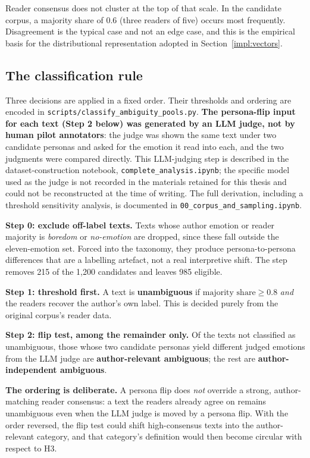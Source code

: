 Reader consensus does not cluster at the top of that scale. In the candidate corpus, a majority
share of $0.6$ (three readers of five) occurs most frequently. Disagreement is the typical case
and not an edge case, and this is the empirical basis for the distributional representation
adopted in Section~\ref{impl:vectors}.

\subsection{The classification rule}
\label{meth:rule}

\noindent
Three decisions are applied in a fixed order. Their thresholds and ordering are encoded in
\texttt{scripts/classify\_ambiguity\_pools.py}. \textbf{The persona-flip input for each text (Step
2 below) was generated by an LLM judge, not by human pilot annotators}: the judge was shown the
same text under two candidate personas and asked for the emotion it read into each, and the two
judgments were compared directly. This LLM-judging step is described in the dataset-construction
notebook, \texttt{complete\_analysis.ipynb}; the specific model used as the judge is not recorded
in the materials retained for this thesis and could not be reconstructed at the time of writing.
The full derivation, including a threshold sensitivity analysis, is documented in
\texttt{00\_corpus\_and\_sampling.ipynb}.

\textbf{Step 0: exclude off-label texts.} Texts whose author emotion or reader majority is
\emph{boredom} or \emph{no-emotion} are dropped, since these fall outside the eleven-emotion set.
Forced into the taxonomy, they produce persona-to-persona differences that are a labelling
artefact, not a real interpretive shift. The step removes 215 of the 1{,}200 candidates and
leaves 985 eligible.

\textbf{Step 1: threshold first.} A text is \textbf{unambiguous} if
$\text{majority share} \geq 0.8$ \emph{and} the readers recover the author's own label. This is
decided purely from the original corpus's reader data.

\textbf{Step 2: flip test, among the remainder only.} Of the texts not classified as
unambiguous, those whose two candidate personas yield different judged emotions from the LLM judge
are \textbf{author-relevant ambiguous}; the rest are \textbf{author-independent ambiguous}.

\noindent
\textbf{The ordering is deliberate.} A persona flip does \emph{not} override a strong,
author-matching reader consensus: a text the readers already agree on remains unambiguous even
when the LLM judge is moved by a persona flip. With the order reversed, the flip test could shift
high-consensus texts into the author-relevant category, and that category's definition would then
become circular with respect to H3.

